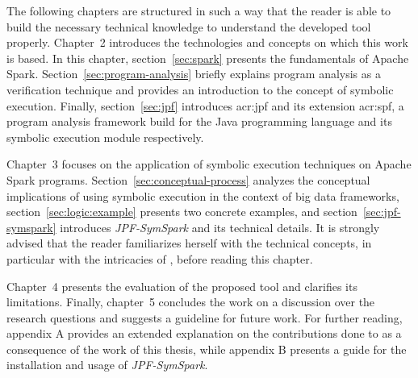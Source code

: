 The following chapters are structured in such a way that the reader is able to build the necessary technical knowledge to understand the developed tool properly. Chapter~2 introduces the technologies and concepts on which this work is based. In this chapter, section~\ref{sec:spark} presents the fundamentals of Apache Spark. Section~\ref{sec:program-analysis} briefly explains program analysis as a verification technique and provides an introduction to the concept of symbolic execution. Finally, section~\ref{sec:jpf} introduces \acrlong{acr:jpf} and its extension \acrlong{acr:spf}, a program analysis framework build for the Java programming language and its symbolic execution module respectively.

Chapter~3 focuses on the application of symbolic execution techniques on Apache Spark programs. Section~\ref{sec:conceptual-process} analyzes the conceptual implications of using symbolic execution in the context of big data frameworks, section~\ref{sec:logic:example} presents two concrete examples, and section~\ref{sec:jpf-symspark} introduces \textit{JPF-SymSpark} and its technical details. It is strongly advised that the reader familiarizes herself with the technical concepts, in particular with the intricacies of \jpf{}, before reading this chapter.

Chapter~4 presents the evaluation of the proposed tool and clarifies its limitations. Finally, chapter~5 concludes the work on a discussion over the research questions and suggests a guideline for future work. For further reading, appendix A provides an extended explanation on the contributions done to \spf{} as a consequence of the work of this thesis, while appendix B presents a guide for the installation and usage of \textit{JPF-SymSpark}.

 
